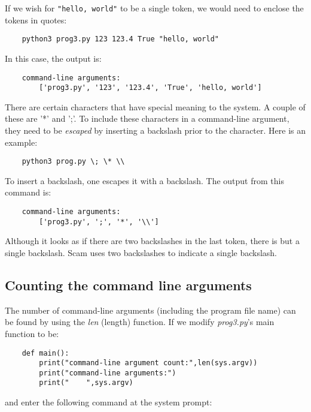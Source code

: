 If we wish for {\tt "hello, world"} to be a single token,
we would need to enclose the tokens in quotes:

\begin{verbatim}
    python3 prog3.py 123 123.4 True "hello, world"
\end{verbatim}

In this case, the output is:

\begin{verbatim}
    command-line arguments:
        ['prog3.py', '123', '123.4', 'True', 'hello, world']
\end{verbatim}

There are certain characters that have special meaning to
the system. A couple of these are '*' and ';'. To include
these characters in a command-line argument, they need to
be {\it escaped} by inserting a backslash prior to the 
character.
Here is an example:

\begin{verbatim}
    python3 prog.py \; \* \\
\end{verbatim}

To insert a backslash, one escapes it with a backslash.
The output from this command is:

\begin{verbatim}
    command-line arguments:
        ['prog3.py', ';', '*', '\\']
\end{verbatim}

Although it looks as if there are two backslashes in the last
token, there is but a single backslash. Scam uses two
backslashes to indicate a single backslash.

\subsection*{Counting the command line arguments}

The number of command-line arguments (including the program file name)
can be found by using the {\it len} (length) function. If we modify
{\it prog3.py}'s main function to be:

\begin{verbatim}
    def main():
        print("command-line argument count:",len(sys.argv))
        print("command-line arguments:")
        print("    ",sys.argv)
\end{verbatim}

and enter the following command at the system prompt:

